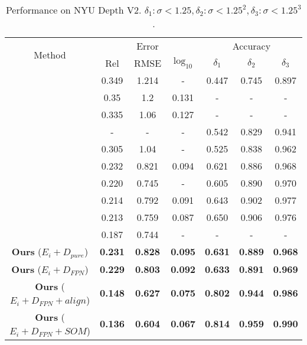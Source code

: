 \documentclass[letterpaper]{article} \usepackage{aaai20}  \usepackage{times}  \usepackage{helvet} \usepackage{courier}  \usepackage{graphicx} \frenchspacing  \setlength{\pdfpagewidth}{8.5in}  \setlength{\pdfpageheight}{11in}  \usepackage{epsfig}
\begin{document}
    \begin{table}[t]
    	\vspace{-8pt}
    	\caption{Performance on NYU Depth V2. $\delta_1: \sigma<1.25, \delta_2: \sigma<1.25^2,\delta_3: \sigma<1.25^3$.}
    	\label{tab:nyu}
    	\centering
    	\resizebox{0.49\textwidth}{!}
    	{
    		\begin{tabular}{|c|c|c|c|c|c|c|}
    			\hline
    			\multirow{2}{*}{Method}                         & \multicolumn{3}{c|}{Error} & \multicolumn{3}{c|}{Accuracy}        \\ \cline{2-7} 
    			& Rel        & RMSE         & $\log_{10}$       & $\delta_1$ & $\delta_2$ & $\delta_3$ \\ \hline
    			\cite{Saxena2009Make3D} & 0.349   & 1.214        & -     & 0.447     & 0.745     & 0.897   \\ \hline
    			\cite{Kevin2012Depth}  & 0.35           & 1.2     & 0.131 & - & -      & -   \\ \hline
    			\cite{Liu2014Discrete}  & 0.335  & 1.06 & 0.127 & - & - & - \\ \hline
    			\cite{Shi2014Pulling}   & -  & -  & -  & 0.542  & 0.829  & 0.941             \\ \hline
    			\cite{Zhuo2015Indoor}  & 0.305  & 1.04  & -  & 0.525  & 0.838  & 0.962             \\ \hline
    			\cite{Li2015Depth} & 0.232  & 0.821  & 0.094  & 0.621  & 0.886  & 0.968   \\ \hline
    			\cite{Wang2015Towards}  & 0.220  & 0.745  & -  & 0.605  & 0.890  & 0.970  \\ \hline
    			\cite{Xu2018PAD} & 0.214 &0.792& 0.091& 0.643& 0.902 &0.977 \\ \hline
    			\cite{Liu2016Learning}  & 0.213  & 0.759  & 0.087 & 0.650 & 0.906 & 0.976 \\ \hline
    			\cite{Roy2016Monocular}  & 0.187  & 0.744  & - & - & - & - \\ \hline
    			\textbf{Ours} ($E_i + D_{pure}$) & \textbf{0.231}  & \textbf{0.828} & \textbf{0.095} & \textbf{0.631} & \textbf{0.889} & \textbf{0.968} \\ \hline
    			\textbf{Ours} ($E_i + D_{FPN}$) & \textbf{0.229}  & \textbf{0.803} & \textbf{0.092} & \textbf{0.633} & \textbf{0.891} & \textbf{0.969} \\ \hline
    			\textbf{Ours} ($E_i + D_{FPN} + align$) & \textbf{0.148}  & \textbf{0.627} & \textbf{0.075} & \textbf{0.802} & \textbf{0.944} & \textbf{0.986} \\ \hline
    			\textbf{Ours} ($E_i + D_{FPN} + SOM$) & \textbf{0.136}  & \textbf{0.604} & \textbf{0.067} & \textbf{0.814} & \textbf{0.959} & \textbf{0.990} \\ \hline
    	\end{tabular}}
    	\vspace{-12pt}
    \end{table}
\end{document}
